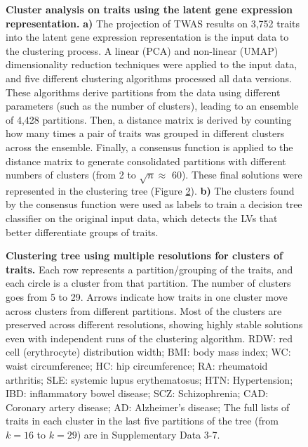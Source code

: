 \documentclass[
  a4paper,
]{article}
\begin{document}
\begin{figure}
\hypertarget{fig:clustering:design}{%
\centering
% 
\caption{\textbf{Cluster analysis on traits using the latent gene expression representation.}
\textbf{a)} The projection of TWAS results on 3,752 traits into the latent gene expression representation is the input data to the clustering process.
A linear (PCA) and non-linear (UMAP) dimensionality reduction techniques were applied to the input data, and five different clustering algorithms processed all data versions.
These algorithms derive partitions from the data using different parameters (such as the number of clusters), leading to an ensemble of 4,428 partitions.
Then, a distance matrix is derived by counting how many times a pair of traits was grouped in different clusters across the ensemble.
Finally, a consensus function is applied to the distance matrix to generate consolidated partitions with different numbers of clusters (from 2 to \(\sqrt{n}\approx\) 60).
These final solutions were represented in the clustering tree (Figure \ref{fig:clustering:tree}).
\textbf{b)} The clusters found by the consensus function were used as labels to train a decision tree classifier on the original input data, which detects the LVs that better differentiate groups of traits.}\label{fig:clustering:design}
}
\end{figure}

\begin{figure}
\hypertarget{fig:clustering:tree}{%
\centering
% 
\caption{\textbf{Clustering tree using multiple resolutions for clusters of traits.}
Each row represents a partition/grouping of the traits, and each circle is a cluster from that partition.
The number of clusters goes from 5 to 29.
Arrows indicate how traits in one cluster move across clusters from different partitions.
Most of the clusters are preserved across different resolutions, showing highly stable solutions even with independent runs of the clustering algorithm.
RDW: red cell (erythrocyte) distribution width;
BMI: body mass index;
WC: waist circumference;
HC: hip circumference;
RA: rheumatoid arthritis;
SLE: systemic lupus erythematosus;
HTN: Hypertension;
IBD: inflammatory bowel disease;
SCZ: Schizophrenia;
CAD: Coronary artery disease;
AD: Alzheimer's disease;
The full lists of traits in each cluster in the last five partitions of the tree (from \(k=16\) to \(k=29\)) are in Supplementary Data 3-7.}\label{fig:clustering:tree}
}
\end{figure}
\end{document}
